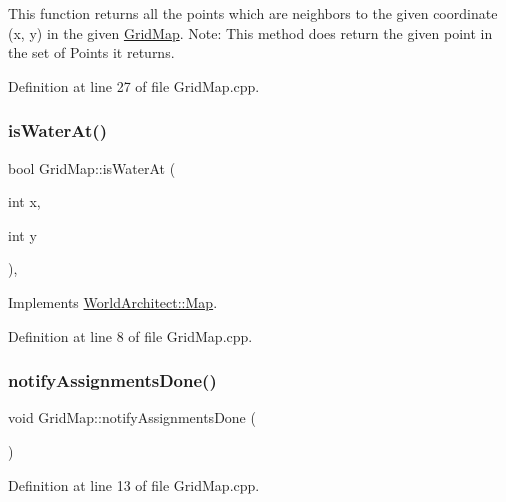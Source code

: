 This function returns all the points which are neighbors to the given coordinate (x, y) in the given \mbox{\hyperlink{class_world_architect_1_1_grid_map}{Grid\+Map}}. Note\+: This method does return the given point in the set of Points it returns. 

Definition at line 27 of file Grid\+Map.\+cpp.

\mbox{\label{class_world_architect_1_1_grid_map_ae4562a4b2e6db010954854d64d1c5103}} 
\subsubsection{\texorpdfstring{isWaterAt()}{isWaterAt()}}
{\footnotesize\ttfamily bool Grid\+Map\+::is\+Water\+At (\begin{DoxyParamCaption}\item[{int}]{x,  }\item[{int}]{y }\end{DoxyParamCaption})\hspace{0.3cm}{\ttfamily [override]}, {\ttfamily [virtual]}}



Implements \mbox{\hyperlink{class_world_architect_1_1_map_a9bc642e73c611d59d5185c7973c8bd09}{World\+Architect\+::\+Map}}.



Definition at line 8 of file Grid\+Map.\+cpp.

\mbox{\label{class_world_architect_1_1_grid_map_ac3ccd253b5ab9e734df8286399241ea1}} 
\subsubsection{\texorpdfstring{notifyAssignmentsDone()}{notifyAssignmentsDone()}}
{\footnotesize\ttfamily void Grid\+Map\+::notify\+Assignments\+Done (\begin{DoxyParamCaption}{ }\end{DoxyParamCaption})}



Definition at line 13 of file Grid\+Map.\+cpp.

